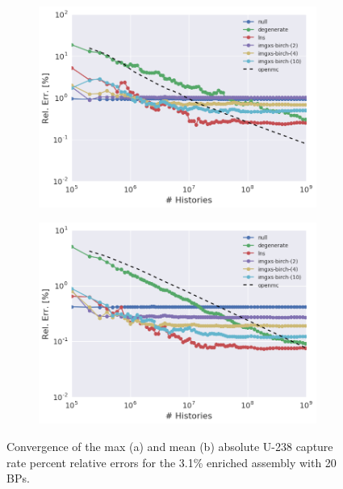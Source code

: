 \begin{figure}[h!]
\centering
\begin{subfigure}{\textwidth}
  \centering
  \includegraphics[width=0.9\linewidth]{figures/results/convergence/assm-31-20BPs/max-capt-err-evo}
  \caption{}
  \label{fig:chap11-assm-3.1-20BPs-capture-converge-max}
\end{subfigure}
\begin{subfigure}{\textwidth}
  \centering
  \includegraphics[width=0.9\linewidth]{figures/results/convergence/assm-31-20BPs/mean-capt-err-evo}
  \caption{}
  \label{fig:chap11-assm-3.1-20BPs-capture-converge-mean}
\end{subfigure}
\vspace{2mm}
\caption[Fission rate covergence for a 3.1\% enriched assembly with 20 \acp{BP}]{Convergence of the max (a) and mean (b) absolute U-238 capture rate percent relative errors for the 3.1\% enriched assembly with 20 \acp{BP}.}
\label{fig:chap11-assm-3.1-20BPs-capture-converge}
\end{figure}

